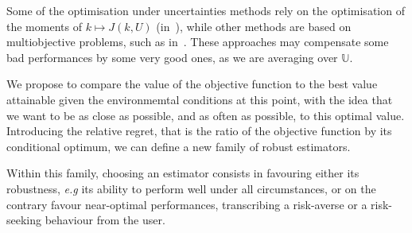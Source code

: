 \documentclass[../../Main_ManuscritThese.tex]{subfiles}
\begin{document}
  Some of the optimisation under uncertainties methods rely on the optimisation of the moments of $ k\mapsto J(k,U)$ (in~\cite{lehman_designing_2004,janusevskis_simultaneous_2010}), while other methods are based on multiobjective problems, such as in~\cite{baudoui_optimisation_2012,ribaud_krigeage_2018}.
  These approaches may compensate some bad performances by some very good ones, as we are averaging over $\mathbb{U}$. 

  
  We propose to compare the value of the objective function to the best value attainable given the environmemtal conditions at this point, with the idea that we want to be as close as possible, and as often as possible, to this optimal value. Introducing the relative regret, that is the ratio of the objective function by its conditional optimum, we can define a new family of robust estimators.

  Within this family, choosing an estimator consists in favouring either its robustness, \emph{e.g} its ability to perform well under all circumstances, or on the contrary favour near-optimal performances, transcribing a risk-averse or a risk-seeking behaviour from the user.
 


\subfileLocal{
	\pagestyle{empty}
	
	
}
\end{document}
